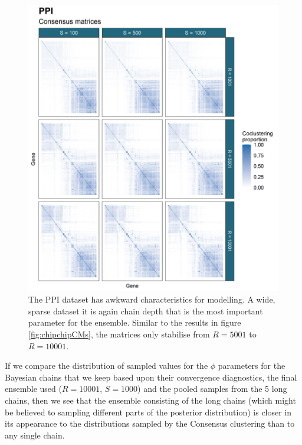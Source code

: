 \documentclass[]{article}
\begin{document}
\begin{figure}
	\centering
	\includegraphics[scale=0.8]{./Images/Yeast/PPICMcomparison.png}
	\caption{The PPI dataset has awkward characteristics for modelling. A wide, sparse dataset it is again chain depth that is the most important parameter for the ensemble. Similar to the results in figure \ref{fig:chipchipCMs}, the matrices only stabilise from $R=5001$ to $R=10001$.}
	\label{fig:ppiCMs}
\end{figure}

If we compare the distribution of sampled values for the $\phi$ parameters for the Bayesian chains that we keep based upon their convergence diagnostics, the final ensemble used ($R=10001$, $S=1000$) and the pooled samples from the 5 long chains, then we see that the ensemble consisting of the long chains (which might be believed to sampling different parts of the posterior distribution) is closer in its appearance to the distributions sampled by the Consensus clustering than to any single chain.
\end{document}
